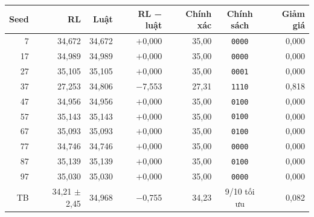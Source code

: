 \begin{tabular}{rrrrrcr}
\toprule
Seed & RL & Luật & RL − luật & Chính xác & \makecell[c]{Chính\\sách} & Giảm giá \\
\midrule
7 & 34{,}672 & 34{,}672 & \ensuremath{+}0{,}000 & 35{,}00 & \texttt{0000} & 0{,}000 \\
17 & 34{,}989 & 34{,}989 & \ensuremath{+}0{,}000 & 35{,}00 & \texttt{0000} & 0{,}000 \\
27 & 35{,}105 & 35{,}105 & \ensuremath{+}0{,}000 & 35{,}00 & \texttt{0001} & 0{,}000 \\
37 & 27{,}253 & 34{,}806 & \ensuremath{-}7{,}553 & 27{,}31 & \texttt{1110} & 0{,}818 \\
47 & 34{,}956 & 34{,}956 & \ensuremath{+}0{,}000 & 35{,}00 & \texttt{0100} & 0{,}000 \\
57 & 35{,}143 & 35{,}143 & \ensuremath{+}0{,}000 & 35{,}00 & \texttt{0100} & 0{,}000 \\
67 & 35{,}093 & 35{,}093 & \ensuremath{+}0{,}000 & 35{,}00 & \texttt{0100} & 0{,}000 \\
77 & 34{,}746 & 34{,}746 & \ensuremath{+}0{,}000 & 35{,}00 & \texttt{0000} & 0{,}000 \\
87 & 35{,}139 & 35{,}139 & \ensuremath{+}0{,}000 & 35{,}00 & \texttt{0100} & 0{,}000 \\
97 & 35{,}030 & 35{,}030 & \ensuremath{+}0{,}000 & 35{,}00 & \texttt{0000} & 0{,}000 \\
\midrule
TB & 34{,}21 $\pm$ 2{,}45 & 34{,}968 & \ensuremath{-}0{,}755 & 34{,}23 & 9/10 tối ưu & 0{,}082 \\
\bottomrule
\end{tabular}
